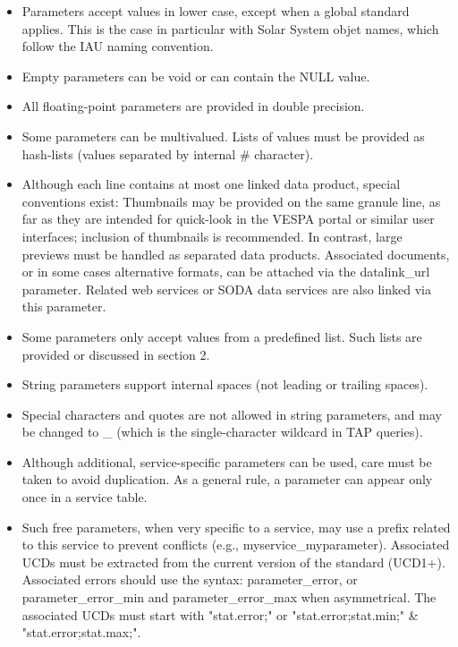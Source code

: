 \documentclass[11pt,a4paper]{ivoa}
\begin{document}
\begin{itemize}
\begin{itemize}
\item Parameters accept values in lower case, except when a global standard applies. This is the case in particular with Solar System objet names, which follow the IAU naming convention. 

\item Empty parameters can be void or can contain the NULL value. 

\item All floating-point parameters are provided in double precision.

\item Some parameters can be multivalued. Lists of values must be provided as hash-lists (values separated by internal \# character).

\item Although each line contains at most one linked data product, special conventions exist: 
Thumbnails may be provided on the same granule line, as far as they are intended for quick-look in the VESPA portal or similar user interfaces; inclusion of thumbnails is recommended. In contrast, large previews must be handled as separated data products.
Associated documents, or in some cases alternative formats, can be attached via the datalink\_url parameter. Related web services or SODA data services are also linked via this parameter.

\item Some parameters only accept values from a predefined list. Such lists are provided or discussed in section 2.

\item String parameters support internal spaces (not leading or trailing spaces).

\item Special characters and quotes are not allowed in string parameters, and may be changed to \_ (which is the single-character wildcard in TAP queries). 

\item Although additional, service-specific parameters can be used, care must be taken to avoid duplication. As a general rule, a parameter can appear only once in a service table.

\item Such free parameters, when very specific to a service, may use a prefix related to this service to prevent conflicts (e.g., myservice\_myparameter). Associated UCDs must be extracted from the current version of the standard (UCD1+).
Associated errors should use the syntax: parameter\_error, or parameter\_error\_min and parameter\_error\_max when asymmetrical. The associated UCDs must start with "stat.error;" or "stat.error;stat.min;" \& "stat.error;stat.max;".
\end{itemize}


\end{itemize}
\end{document}

